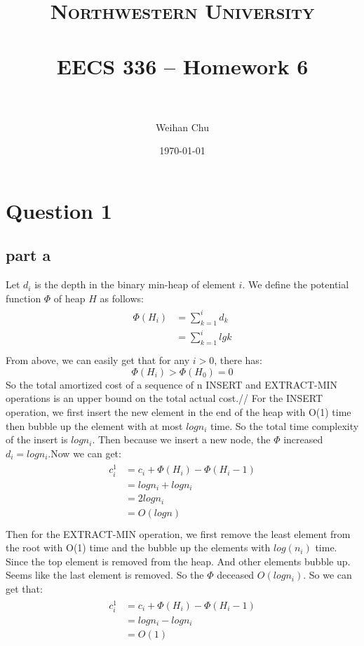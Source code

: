 \documentclass[paper=a4, fontsize=11pt]{scrartcl} %
\title{	
\normalfont \normalsize 
\textsc{Northwestern University} \\ [25pt] %
\horrule{0.5pt} \\[0.4cm] %
\huge EECS 336 -- Homework 6 \\ %
\horrule{2pt} \\[0.5cm] %
}
\author{Weihan Chu} %
\date{\normalsize\today} %
\numberwithin{equation}{section} %
\numberwithin{figure}{section} %
\numberwithin{table}{section} %
\begin{document}
\maketitle %


\section{\textbf{Question 1}}
\subsection{\textbf{part a}}
Let $d_i$ is the depth in the binary min-heap of element $i$. We define the potential function $\Phi$ of heap $H$ as follows:
\begin{align*}
\begin{split}
\Phi(H_i)&=\sum_{k=1}^i d_k\\
         &=\sum_{k=1}^i lgk\\
\end{split}
\end{align*}
From above, we can easily get that for any $i>0$, there has:
$$\Phi(H_i)>\Phi(H_0)=0$$
So the total amortized cost of a sequence of n INSERT and EXTRACT-MIN operations is an upper bound on the total actual cost.//
For the INSERT operation, we first insert the new element in the end of the heap with O(1) time then bubble up the element with at most $logn_i$ time. So the total time complexity of the insert is $logn_i$. Then because we insert a new node, the $\Phi$ increased $d_i=logn_i$.Now we can get:
\begin{align*}
\begin{split}
c_i^1 &=c_i+\Phi(H_i)-\Phi(H_i-1)\\
      &=logn_i+logn_i\\
      &=2logn_i\\
      &=O(logn)\\
\end{split}
\end{align*}
Then for the EXTRACT-MIN operation, we first remove the least element from the root with O(1) time and the bubble up the elements with $log(n_i)$ time. Since the top element is removed from the heap. And other elements bubble up. Seems like the last element is removed. So the $\Phi$ deceased $O(logn_i)$. So we can get that:
\begin{align*}
\begin{split}
c_i^1 &=c_i+\Phi(H_i)-\Phi(H_i-1)\\
      &=logn_i-logn_i\\
      &=O(1)\\
\end{split}
\end{align*}
\end{document}
